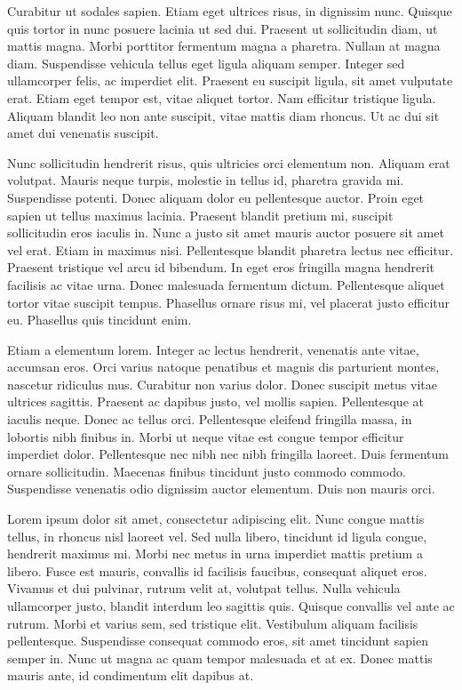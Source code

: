 \documentclass[a4paper,12pt,twoside]{ThesisStyle}
\begin{document}
Curabitur ut sodales sapien. Etiam eget ultrices risus, in dignissim nunc. Quisque quis tortor in nunc posuere lacinia ut sed dui. Praesent ut sollicitudin diam, ut mattis magna. Morbi porttitor fermentum magna a pharetra. Nullam at magna diam. Suspendisse vehicula tellus eget ligula aliquam semper. Integer sed ullamcorper felis, ac imperdiet elit. Praesent eu suscipit ligula, sit amet vulputate erat. Etiam eget tempor est, vitae aliquet tortor. Nam efficitur tristique ligula. Aliquam blandit leo non ante suscipit, vitae mattis diam rhoncus. Ut ac dui sit amet dui venenatis suscipit.

Nunc sollicitudin hendrerit risus, quis ultricies orci elementum non. Aliquam erat volutpat. Mauris neque turpis, molestie in tellus id, pharetra gravida mi. Suspendisse potenti. Donec aliquam dolor eu pellentesque auctor. Proin eget sapien ut tellus maximus lacinia. Praesent blandit pretium mi, suscipit sollicitudin eros iaculis in. Nunc a justo sit amet mauris auctor posuere sit amet vel erat. Etiam in maximus nisi. Pellentesque blandit pharetra lectus nec efficitur. Praesent tristique vel arcu id bibendum. In eget eros fringilla magna hendrerit facilisis ac vitae urna. Donec malesuada fermentum dictum. Pellentesque aliquet tortor vitae suscipit tempus. Phasellus ornare risus mi, vel placerat justo efficitur eu. Phasellus quis tincidunt enim.

Etiam a elementum lorem. Integer ac lectus hendrerit, venenatis ante vitae, accumsan eros. Orci varius natoque penatibus et magnis dis parturient montes, nascetur ridiculus mus. Curabitur non varius dolor. Donec suscipit metus vitae ultrices sagittis. Praesent ac dapibus justo, vel mollis sapien. Pellentesque at iaculis neque. Donec ac tellus orci. Pellentesque eleifend fringilla massa, in lobortis nibh finibus in. Morbi ut neque vitae est congue tempor efficitur imperdiet dolor. Pellentesque nec nibh nec nibh fringilla laoreet. Duis fermentum ornare sollicitudin. Maecenas finibus tincidunt justo commodo commodo. Suspendisse venenatis odio dignissim auctor elementum. Duis non mauris orci.

Lorem ipsum dolor sit amet, consectetur adipiscing elit. Nunc congue mattis tellus, in rhoncus nisl laoreet vel. Sed nulla libero, tincidunt id ligula congue, hendrerit maximus mi. Morbi nec metus in urna imperdiet mattis pretium a libero. Fusce est mauris, convallis id facilisis faucibus, consequat aliquet eros. Vivamus et dui pulvinar, rutrum velit at, volutpat tellus. Nulla vehicula ullamcorper justo, blandit interdum leo sagittis quis. Quisque convallis vel ante ac rutrum. Morbi et varius sem, sed tristique elit. Vestibulum aliquam facilisis pellentesque. Suspendisse consequat commodo eros, sit amet tincidunt sapien semper in. Nunc ut magna ac quam tempor malesuada et at ex. Donec mattis mauris ante, id condimentum elit dapibus at.
\end{document}
